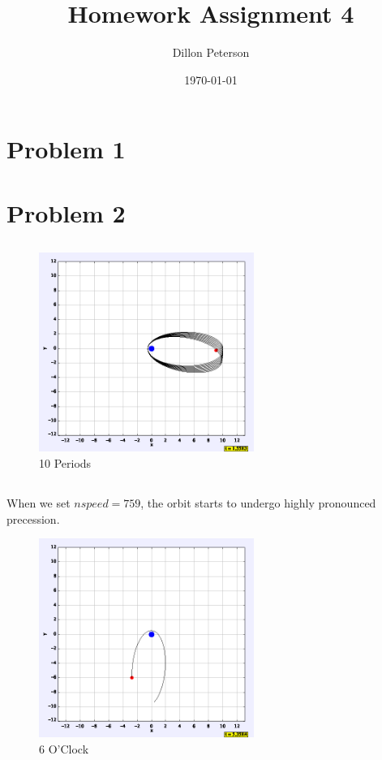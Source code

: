 \documentclass[pra,superscriptaddress,reprint,showpacs]{revtex4-1}
\begin{document}
\title{Homework Assignment 4}
\date{\today}
\author{Dillon Peterson}

\maketitle

\section{Problem 1}
\begin{center}
\checkmark
\end{center}

\section{Problem 2}
\subsection{}
\begin{figure}[h!]
    \centering
    \caption{10 Periods}
    \includegraphics[width=7cm]{2aa.png}
\end{figure}

\subsection{}
When we set $nspeed=759$, the orbit starts to undergo highly pronounced precession. 

\begin{figure}[H]
    \centering 
    \caption{6 O'Clock}
    \includegraphics[width=7cm]{6oclock.png}
\end{figure}
\end{document}

